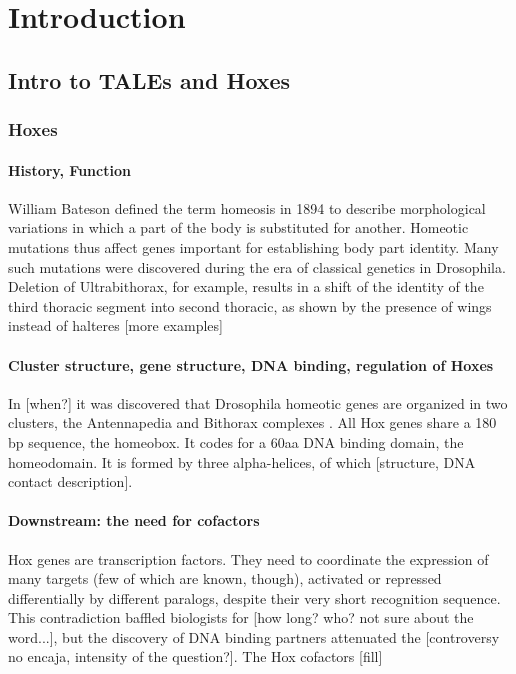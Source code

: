 \chapter{Introduction}


\section{Intro to TALEs and Hoxes}

\subsection{Hoxes}

\subsubsection{History, Function}
William Bateson defined the term homeosis in 1894 to describe morphological variations in which a part of the body is substituted for another. Homeotic mutations thus affect genes important for establishing body part identity. Many such mutations were discovered during the era of classical genetics in Drosophila. Deletion of Ultrabithorax, for example, results in a shift of the identity of the third thoracic segment into second thoracic, as shown by the presence of wings instead of halteres \cite{ref} [more examples]





\subsubsection{Cluster structure, gene structure, DNA binding, regulation of Hoxes}


In [when?] it was discovered that Drosophila homeotic genes are organized in two clusters, the Antennapedia and Bithorax complexes \cite{Lewis1978, Kaufman1990}.
All Hox genes share a 180 bp sequence, the homeobox. It codes for a 60aa DNA binding domain, the homeodomain. It is formed by three alpha-helices, of which [structure, DNA contact description].

\subsubsection{Downstream: the need for cofactors}
Hox genes are transcription factors. They need to coordinate the expression of many targets (few of which are known, though), activated or repressed differentially by different paralogs, despite their very short recognition sequence. This contradiction baffled biologists for [how long? who? not sure about the word...], but the discovery of DNA binding partners attenuated the [controversy no encaja, intensity of the question?]. The Hox cofactors [fill]

